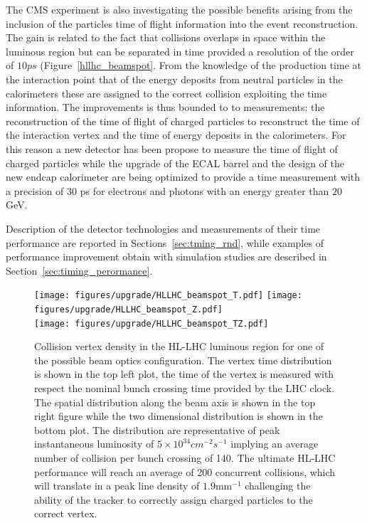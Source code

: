 The CMS experiment is also investigating the possible benefits arising from the inclusion of the particles
time of flight information into the event reconstruction. The gain is related to the fact that
collisions overlaps in space within the luminous region but can be separated in time provided a resolution of the
order of $10 ps$ (Figure~\ref{hllhc_beamspot}.
From the knowledge of the production time at the interaction point that of the energy deposits from neutral
particles in the calorimeters these are assigned to the correct collision exploiting the time information.
The improvements is thus bounded to
to measurements: the reconstruction of the time of flight of charged particles to reconstruct the time
of the interaction vertex and the time of energy deposits in the calorimeters. For this reason a new detector
has been propose to measure the time of flight of charged particles while the upgrade of the ECAL barrel and
the design of the new endcap calorimeter are being optimized to provide a time measurement with a precision
of $30$ ps for electrons and photons with an energy greater than $20$ GeV.

Description of the detector technologies and measurements of their time performance are reported in Sections~\ref{sec:tming_rnd},
while examples of performance improvement obtain with simulation studies are described in Section~\ref{sec:timing_perormance}.

\begin{figure}[h!]
  \centering
  \texttt{[image: figures/upgrade/HLLHC\_beamspot\_T.pdf]}
  \texttt{[image: figures/upgrade/HLLHC\_beamspot\_Z.pdf]} \\
  \texttt{[image: figures/upgrade/HLLHC\_beamspot\_TZ.pdf]}
  \caption{Collision vertex density in the HL-LHC luminous region for one of the possible beam optics configuration.
    The vertex time distribution is shown in the top left plot, the time of the vertex is measured with respect
    the nominal bunch crossing time provided by the LHC clock. The spatial distribution along the beam axis is shown in
    the top right figure while the two dimensional distribution is shown in the bottom plot.
    The distribution are representative of peak instantaneous luminosity of $5\times10^{34} cm^{-2}s^{-1}$ implying
    an average number of collision per bunch crossing of 140. The ultimate HL-LHC performance will reach an average of 200
    concurrent collisions, which will translate in a peak line density of $1.9$mm$^{-1}$ challenging the ability
    of the tracker to correctly assign charged particles to the correct vertex.}
  \label{fig:hllhc_beamspot}
\end{figure}

